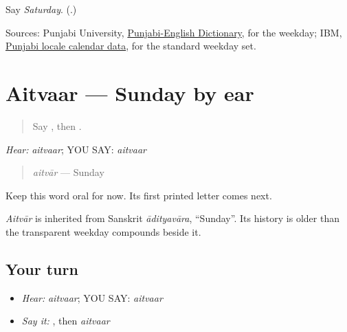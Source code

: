 \begin{tcolorbox}[breakable,colback=teal!4,colframe=teal!35!black,title={Before you move on}]
Say \emph{Saturday}. (\textbf{}.)

Sources: Punjabi University, \href{https://dic.learnpunjabi.org/default.aspx?look=\%E0\%A8\%B8\%E0\%A8\%BC\%E0\%A8\%A8\%E0\%A9\%80\%E0\%A8\%B5\%E0\%A8\%BE\%E0\%A8\%B0}{Punjabi-English Dictionary}, for the weekday; IBM, \href{https://public.dhe.ibm.com/software/globalization/documents/India-Punjabi\_Calendar.pdf}{Punjabi locale calendar data}, for the standard weekday set.
\end{tcolorbox}
\section[aitvaar]{Aitvaar — Sunday by ear}

\label{lesson:PA-C182-aitvar}



\begin{quote}
Say \textbf{}, then \textbf{}.
\end{quote}

\begin{grammarlens}[title={Grammar Lens: one weekday by ear}]
\emph{Hear:} \emph{aitvaar}; YOU SAY: \emph{aitvaar}

\begin{quote}
\emph{aitvār} — Sunday
\end{quote}

Keep this word oral for now. Its first printed letter comes next.
\end{grammarlens}

\begin{cousinweb}
\emph{Aitvār} is inherited from Sanskrit \emph{ādityavāra}, \textquotedblleft{}Sunday\textquotedblright{}. Its history is older than the transparent weekday compounds beside it.
\end{cousinweb}

\subsection*{Your turn}
\begin{itemize}
\raggedright
  \item \emph{Hear:} \emph{aitvaar}; YOU SAY: \emph{aitvaar}
  \item \emph{Say it:} \textbf{}, then \emph{aitvaar}
\end{itemize}

